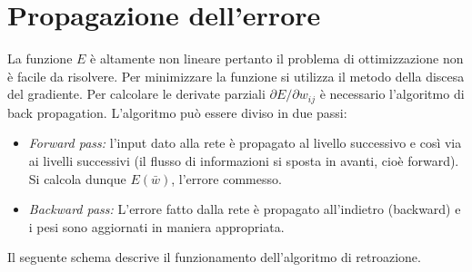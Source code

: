 \newpage

\section{Propagazione dell'errore} %
\label{sec:back_propagation}
La funzione $E$ è altamente non lineare pertanto il problema di ottimizzazione non è facile da risolvere. Per minimizzare la funzione si utilizza il metodo della discesa del gradiente. Per calcolare le derivate parziali $\partial E / \partial w_{ij}$ è necessario l'algoritmo di back propagation. L'algoritmo può essere diviso in due passi:
\begin{itemize}
    \item \emph{Forward pass:} l'input dato alla rete è propagato al livello successivo e così via ai livelli successivi (il flusso di informazioni si sposta in avanti, cioè forward). Si calcola dunque $E(\bar{w})$, l'errore commesso.
    \item \emph{Backward pass:} L'errore fatto dalla rete è propagato all'indietro (backward) e i pesi sono aggiornati in maniera appropriata.
\end{itemize}
Il seguente schema descrive il funzionamento dell'algoritmo di retroazione.

